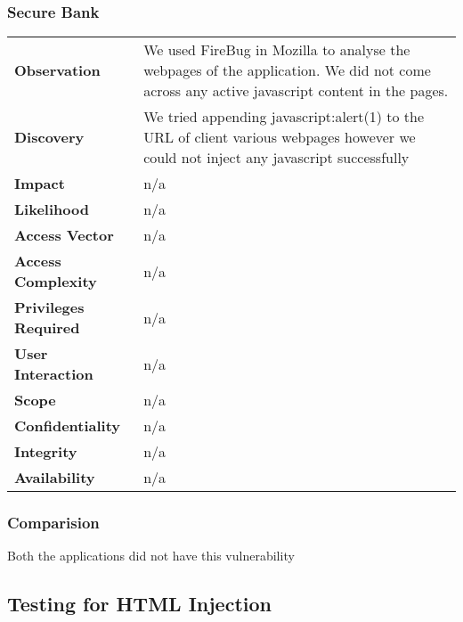 \subsubsection{Secure Bank}
\begin{tabular}{l|p{10cm}}
\textbf{Observation} & We used FireBug in Mozilla to analyse the webpages of the application. We did not come across any active javascript content in the pages.  \\
\textbf{Discovery} & We tried appending javascript:alert(1) to the URL of client various webpages however we could not inject any javascript successfully \\
\textbf{Impact} &  n/a\\
\textbf{Likelihood} & n/a \\
\textbf{Access Vector} & n/a \\
\textbf{Access Complexity} & n/a \\
\textbf{Privileges Required} & n/a \\
\textbf{User Interaction} & n/a \\
\textbf{Scope} & n/a \\
\textbf{Confidentiality} & n/a \\
\textbf{Integrity} & n/a \\
\textbf{Availability} & n/a \\
\end{tabular}

\subsubsection{Comparision}
Both the applications did not have this vulnerability
\subsection{Testing for HTML Injection}
